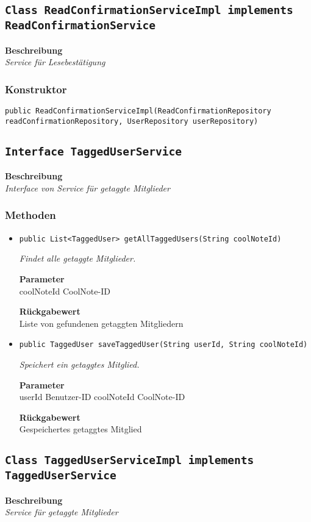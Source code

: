     \subsection{\texttt{Class ReadConfirmationServiceImpl implements ReadConfirmationService}}
    \textbf{Beschreibung} \\
    \textit{Service für Lesebestätigung}
    \subsubsection{Konstruktor}
    \texttt{public ReadConfirmationServiceImpl(ReadConfirmationRepository readConfirmationRepository, UserRepository userRepository)}
    \subsection{\texttt{Interface TaggedUserService}}
    \textbf{Beschreibung} \\
    \textit{Interface von Service für getaggte Mitglieder}
    \subsubsection{Methoden}
    \begin{itemize}
    	\item{\texttt{public List<TaggedUser> getAllTaggedUsers(String coolNoteId)}}
    	
    	\textit{Findet alle getaggte Mitglieder.}
    	
    	\textbf{Parameter} \\
    	coolNoteId CoolNote-ID
    	
    	\textbf{Rückgabewert} \\
    	Liste von gefundenen getaggten Mitgliedern        \item{\texttt{public TaggedUser saveTaggedUser(String userId, String coolNoteId)}}
    	
    	\textit{Speichert ein getaggtes Mitglied.}
    	
    	\textbf{Parameter} \\
    	userId Benutzer-ID
    	coolNoteId CoolNote-ID
    	
    	\textbf{Rückgabewert} \\
    	Gespeichertes getaggtes Mitglied
    \end{itemize}
    \subsection{\texttt{Class TaggedUserServiceImpl implements TaggedUserService}}
    \textbf{Beschreibung} \\
    \textit{Service für getaggte Mitglieder}
